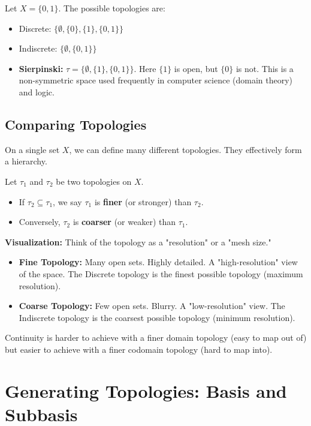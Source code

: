 \begin{example}
Let $X = \{0, 1\}$. The possible topologies are:
\begin{itemize}
    \item Discrete: $\{\emptyset, \{0\}, \{1\}, \{0,1\}\}$
    \item Indiscrete: $\{\emptyset, \{0,1\}\}$
    \item \textbf{Sierpinski:} $\tau = \{\emptyset, \{1\}, \{0,1\}\}$. Here $\{1\}$ is open, but $\{0\}$ is not. This is a non-symmetric space used frequently in computer science (domain theory) and logic.
\end{itemize}
\end{example}

\subsection{Comparing Topologies}

On a single set $X$, we can define many different topologies. They effectively form a hierarchy.

\begin{definition}
Let $\tau_1$ and $\tau_2$ be two topologies on $X$.
\begin{itemize}
    \item If $\tau_2 \subseteq \tau_1$, we say $\tau_1$ is \textbf{finer} (or stronger) than $\tau_2$.
    \item Conversely, $\tau_2$ is \textbf{coarser} (or weaker) than $\tau_1$.
\end{itemize}
\end{definition}

\textbf{Visualization:} Think of the topology as a "resolution" or a "mesh size."
\begin{itemize}
    \item \textbf{Fine Topology:} Many open sets. Highly detailed. A "high-resolution" view of the space. The Discrete topology is the finest possible topology (maximum resolution).
    \item \textbf{Coarse Topology:} Few open sets. Blurry. A "low-resolution" view. The Indiscrete topology is the coarsest possible topology (minimum resolution).
\end{itemize}
Continuity is harder to achieve with a finer domain topology (easy to map out of) but easier to achieve with a finer codomain topology (hard to map into).

\section{Generating Topologies: Basis and Subbasis}

